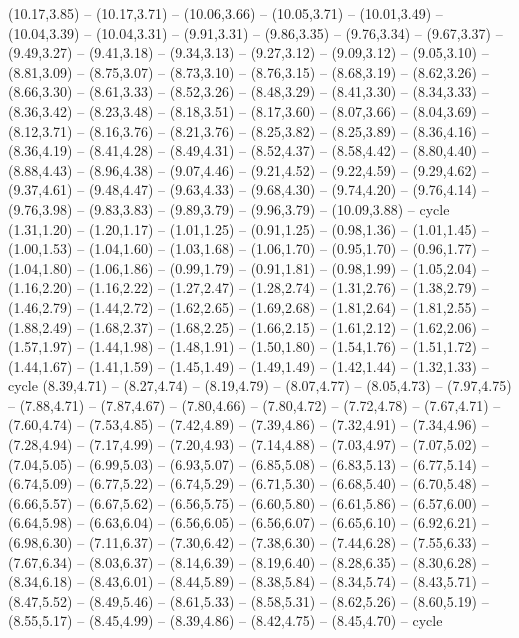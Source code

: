 \expandafter\def\csname geo:gebiet:ROU\endcsname{
  (10.17,3.85) -- (10.17,3.71) -- (10.06,3.66) -- (10.05,3.71) -- (10.01,3.49) -- (10.04,3.39) -- (10.04,3.31) -- (9.91,3.31) -- (9.86,3.35) -- (9.76,3.34) -- (9.67,3.37) -- (9.49,3.27) -- (9.41,3.18) -- (9.34,3.13) -- (9.27,3.12) -- (9.09,3.12) -- (9.05,3.10) -- (8.81,3.09) -- (8.75,3.07) -- (8.73,3.10) -- (8.76,3.15) -- (8.68,3.19) -- (8.62,3.26) -- (8.66,3.30) -- (8.61,3.33) -- (8.52,3.26) -- (8.48,3.29) -- (8.41,3.30) -- (8.34,3.33) -- (8.36,3.42) -- (8.23,3.48) -- (8.18,3.51) -- (8.17,3.60) -- (8.07,3.66) -- (8.04,3.69) -- (8.12,3.71) -- (8.16,3.76) -- (8.21,3.76) -- (8.25,3.82) -- (8.25,3.89) -- (8.36,4.16) -- (8.36,4.19) -- (8.41,4.28) -- (8.49,4.31) -- (8.52,4.37) -- (8.58,4.42) -- (8.80,4.40) -- (8.88,4.43) -- (8.96,4.38) -- (9.07,4.46) -- (9.21,4.52) -- (9.22,4.59) -- (9.29,4.62) -- (9.37,4.61) -- (9.48,4.47) -- (9.63,4.33) -- (9.68,4.30) -- (9.74,4.20) -- (9.76,4.14) -- (9.76,3.98) -- (9.83,3.83) -- (9.89,3.79) -- (9.96,3.79) -- (10.09,3.88) -- cycle}
\expandafter\def\csname geo:gebiet:PRT\endcsname{
  (1.31,1.20) -- (1.20,1.17) -- (1.01,1.25) -- (0.91,1.25) -- (0.98,1.36) -- (1.01,1.45) -- (1.00,1.53) -- (1.04,1.60) -- (1.03,1.68) -- (1.06,1.70) -- (0.95,1.70) -- (0.96,1.77) -- (1.04,1.80) -- (1.06,1.86) -- (0.99,1.79) -- (0.91,1.81) -- (0.98,1.99) -- (1.05,2.04) -- (1.16,2.20) -- (1.16,2.22) -- (1.27,2.47) -- (1.28,2.74) -- (1.31,2.76) -- (1.38,2.79) -- (1.46,2.79) -- (1.44,2.72) -- (1.62,2.65) -- (1.69,2.68) -- (1.81,2.64) -- (1.81,2.55) -- (1.88,2.49) -- (1.68,2.37) -- (1.68,2.25) -- (1.66,2.15) -- (1.61,2.12) -- (1.62,2.06) -- (1.57,1.97) -- (1.44,1.98) -- (1.48,1.91) -- (1.50,1.80) -- (1.54,1.76) -- (1.51,1.72) -- (1.44,1.67) -- (1.41,1.59) -- (1.45,1.49) -- (1.49,1.49) -- (1.42,1.44) -- (1.32,1.33) -- cycle}
\expandafter\def\csname geo:gebiet:POL\endcsname{
  (8.39,4.71) -- (8.27,4.74) -- (8.19,4.79) -- (8.07,4.77) -- (8.05,4.73) -- (7.97,4.75) -- (7.88,4.71) -- (7.87,4.67) -- (7.80,4.66) -- (7.80,4.72) -- (7.72,4.78) -- (7.67,4.71) -- (7.60,4.74) -- (7.53,4.85) -- (7.42,4.89) -- (7.39,4.86) -- (7.32,4.91) -- (7.34,4.96) -- (7.28,4.94) -- (7.17,4.99) -- (7.20,4.93) -- (7.14,4.88) -- (7.03,4.97) -- (7.07,5.02) -- (7.04,5.05) -- (6.99,5.03) -- (6.93,5.07) -- (6.85,5.08) -- (6.83,5.13) -- (6.77,5.14) -- (6.74,5.09) -- (6.77,5.22) -- (6.74,5.29) -- (6.71,5.30) -- (6.68,5.40) -- (6.70,5.48) -- (6.66,5.57) -- (6.67,5.62) -- (6.56,5.75) -- (6.60,5.80) -- (6.61,5.86) -- (6.57,6.00) -- (6.64,5.98) -- (6.63,6.04) -- (6.56,6.05) -- (6.56,6.07) -- (6.65,6.10) -- (6.92,6.21) -- (6.98,6.30) -- (7.11,6.37) -- (7.30,6.42) -- (7.38,6.30) -- (7.44,6.28) -- (7.55,6.33) -- (7.67,6.34) -- (8.03,6.37) -- (8.14,6.39) -- (8.19,6.40) -- (8.28,6.35) -- (8.30,6.28) -- (8.34,6.18) -- (8.43,6.01) -- (8.44,5.89) -- (8.38,5.84) -- (8.34,5.74) -- (8.43,5.71) -- (8.47,5.52) -- (8.49,5.46) -- (8.61,5.33) -- (8.58,5.31) -- (8.62,5.26) -- (8.60,5.19) -- (8.55,5.17) -- (8.45,4.99) -- (8.39,4.86) -- (8.42,4.75) -- (8.45,4.70) -- cycle}
